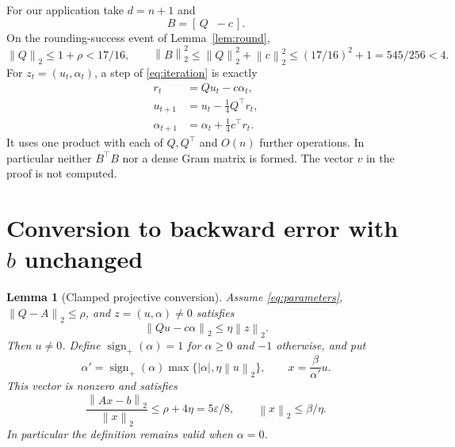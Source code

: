 \documentclass[11pt,a4paper]{article}
\newtheorem{lemma}[theorem]{Lemma}
\theoremstyle{remark}
\newcommand{\eps}{\varepsilon}
\newcommand{\norm}[1]{\left\|#1\right\|_2}
\newcommand{\abs}[1]{\left|#1\right|}
\newcommand{\sgnp}{\operatorname{sign}_{+}}
\begin{document}
For our application take $d=n+1$ and
\begin{equation}\label{eq:B}
 B=[\,Q\;\;-c\,].
\end{equation}
On the rounding-success event of Lemma~\ref{lem:round},
\begin{equation}\label{eq:Bnorm}
 \norm{Q}\le1+\rho<17/16,\qquad
 \norm{B}^2\le\norm{Q}^2+\norm{c}^2
 \le(17/16)^2+1=545/256<4.
\end{equation}
For $z_t=(u_t,\alpha_t)$, a step of \eqref{eq:iteration} is exactly
\begin{equation}\label{eq:implementedstep}
 \begin{aligned}
 r_t&=Qu_t-c\alpha_t,\\
 u_{t+1}&=u_t-\tfrac14Q^\top r_t,\\
 \alpha_{t+1}&=\alpha_t+\tfrac14c^\top r_t.
 \end{aligned}
\end{equation}
It uses one product with each of $Q,Q^\top$ and $O(n)$ further operations.
In particular neither $B^\top B$ nor a dense Gram matrix is formed.
The vector $v$ in the proof is not computed.

\section{Conversion to backward error with \texorpdfstring{$b$}{b} unchanged}

\begin{lemma}[Clamped projective conversion]\label{lem:convert}
Assume \eqref{eq:parameters}, $\norm{Q-A}\le\rho$, and
$z=(u,\alpha)\ne0$ satisfies
\begin{equation}\label{eq:conversionhyp}
 \norm{Qu-c\alpha}\le\eta\norm{z}.
\end{equation}
Then $u\ne0$. Define $\sgnp(\alpha)=1$ for $\alpha\ge0$ and $-1$ otherwise,
and put
\begin{equation}\label{eq:clamp}
 \alpha'=\sgnp(\alpha)\max\{\abs{\alpha},\eta\norm{u}\},
 \qquad x=\frac{\beta}{\alpha'}u.
\end{equation}
This vector is nonzero and satisfies
\begin{equation}\label{eq:converted}
 \frac{\norm{Ax-b}}{\norm{x}}\le\rho+4\eta=5\eps/8,
 \qquad \norm{x}\le\beta/\eta.
\end{equation}
In particular the definition remains valid when $\alpha=0$.
\end{lemma}
\end{document}

